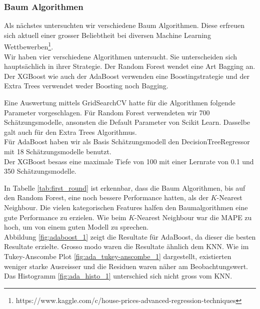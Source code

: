 \subsubsection{Baum Algorithmen}
Als nächstes untersuchten wir verschiedene Baum Algorithmen. Diese erfreuen sich aktuell einer grosser Beliebtheit bei diversen Machine Learning Wettbewerben\footnote{https://www.kaggle.com/c/house-prices-advanced-regression-techniques}.\\[2ex]
%
Wir haben vier verschiedene Algorithmen untersucht. Sie unterscheiden sich hauptsächlich in ihrer Strategie. Der Random Forest wendet eine Art Bagging an. Der XGBoost wie auch der AdaBoost verwenden eine Boostingstrategie und der Extra Trees verwendet weder Boosting noch Bagging.

Eine Auswertung mittels GridSearchCV hatte für die Algorithmen folgende Parameter vorgeschlagen.
Für Random Forest verwendeten wir 700 Schätzungsmodelle, ansonsten die Default Parameter von Scikit Learn. Dasselbe galt auch für den Extra Trees Algorithmus.\\
Für AdaBoost haben wir als Basis Schätzungsmodell den DecisionTreeRegressor mit 18 Schätzungsmodelle benutzt.\\
Der XGBoost besass eine maximale Tiefe von 100 mit einer Lernrate von 0.1 und 350 Schätzungsmodelle.

\begin{table}[ht]
\centering
{}
\caption{Ergebnisse der Baum Algorithmen}
\label{tab:first_round}
\end{table}

In Tabelle \ref{tab:first_round} ist erkennbar, dass die Baum Algorithmen, bis auf den Random Forest, eine noch bessere Performance hatten, als der $K$-Nearest Neighbour. Die vielen kategorischen Features halfen den Baumalgorithmen eine gute Performance zu erzielen. Wie beim $K$-Nearest Neighbour war die MAPE zu hoch, um von einem guten Modell zu sprechen.\\
Abbildung \ref{fig:adaboost_1} zeigt die Resultate für AdaBoost, da dieser die besten Resultate erzielte. Gros­so mo­do waren die Resultate ähnlich dem KNN. Wie im Tukey-Anscombe Plot \ref{fig:ada_tukey-anscombe_1} dargestellt, existierten weniger starke Ausreisser und die Residuen waren näher am Beobachtungswert. Das Histogramm \ref{fig:ada_histo_1} unterschied sich nicht gross vom KNN.


